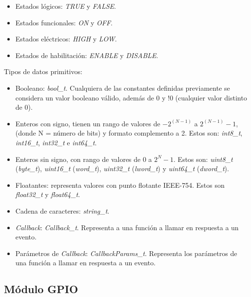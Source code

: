 \begin{itemize}
\item
Estados lógicos: \emph{TRUE} y \emph{FALSE}.
\item
Estados funcionales: \emph{ON} y \emph{OFF}.
\item
Estados eléctricos: \emph{HIGH} y \emph{LOW}.
\item
Estados de habilitación: \emph{ENABLE} y \emph{DISABLE}.
\end{itemize}

Tipos de datos primitivos: 

\begin{itemize}
\item
Booleano: \emph{bool\_t}. Cualquiera de las constantes definidas previamente se considera un valor booleano válido, además de 0 y !0 (cualquier valor distinto de 0).
\item
Enteros con signo, tienen un rango de valores de $-2^{(N-1)}$ a $2^{(N-1)} - 1$, (donde N = número de bits) y formato complemento a 2. Estos son: \emph{int8\_t}, \emph{int16\_t}, \emph{int32\_t} e \emph{int64\_t}.
\item
Enteros sin signo, con rango de valores de $0$ a $2^{N} - 1$. Estos son: \emph{uint8\_t} (\emph{byte\_t}), \emph{uint16\_t} (\emph{word\_t}), \emph{uint32\_t} (\emph{lword\_t}) y \emph{uint64\_t} (\emph{dword\_t}).
\item
Floatantes: representa valores con punto flotante IEEE-754. Estos son \emph{float32\_t} y \emph{float64\_t}.
\item
Cadena de caracteres: \emph{string\_t}.
\item
\emph{Callback}: \emph{Callback\_t}. Representa a una función a llamar en respuesta a un evento.
\item
Parámetros de \emph{Callback}: \emph{CallbackParams\_t}. Representa los parámetros de una función a llamar en respuesta a un evento.
\end{itemize}

\subsection{Módulo GPIO}

